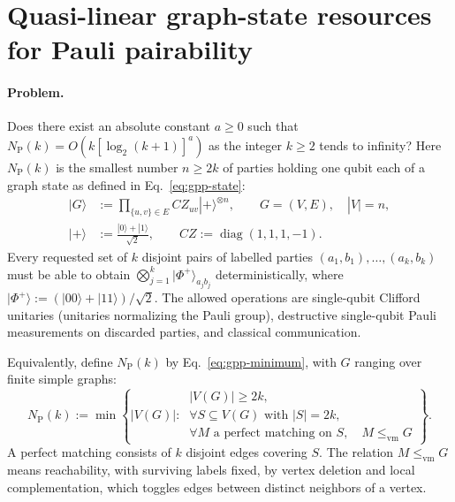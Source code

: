 \section{Quasi-linear graph-state resources for Pauli pairability}
\label{sec:op_21cb3e1c3ed33976}

\paragraph{Problem.}
Does there exist an absolute constant $a\geq0$ such that $N_{\mathrm P}(k)=O(k[\log_2(k+1)]^a)$ as the integer $k\geq2$ tends to infinity? Here $N_{\mathrm P}(k)$ is the smallest number $n\geq2k$ of parties holding one qubit each of a graph state as defined in Eq.~\eqref{eq:gpp-state}:
\begin{equation}
\begin{aligned}
|G\rangle&:=\prod_{\{u,v\}\in E}CZ_{uv}|+\rangle^{\otimes n},
\qquad G=(V,E),\quad |V|=n,\\
|+\rangle&:=\frac{|0\rangle+|1\rangle}{\sqrt2},
\qquad CZ:=\operatorname{diag}(1,1,1,-1).
\end{aligned}
\label{eq:gpp-state}
\end{equation}
Every requested set of $k$ disjoint pairs of labelled parties $(a_1,b_1),\ldots,(a_k,b_k)$ must be able to obtain $\bigotimes_{j=1}^k|\Phi^+\rangle_{a_jb_j}$ deterministically, where $|\Phi^+\rangle:=(|00\rangle+|11\rangle)/\sqrt2$. The allowed operations are single-qubit Clifford unitaries (unitaries normalizing the Pauli group), destructive single-qubit Pauli measurements on discarded parties, and classical communication.

Equivalently, define $N_{\mathrm P}(k)$ by Eq.~\eqref{eq:gpp-minimum}, with $G$ ranging over finite simple graphs:
\begin{equation}
N_{\mathrm P}(k):=\min\left\{
|V(G)|:\ \begin{gathered}
|V(G)|\geq2k,\\
\forall S\subseteq V(G)\text{ with }|S|=2k,\\
\forall M\text{ a perfect matching on }S,\quad M\leq_{\mathrm{vm}}G
\end{gathered}
\right\}.
\label{eq:gpp-minimum}
\end{equation}
A perfect matching consists of $k$ disjoint edges covering $S$. The relation $M\leq_{\mathrm{vm}}G$ means reachability, with surviving labels fixed, by vertex deletion and local complementation, which toggles edges between distinct neighbors of a vertex.

